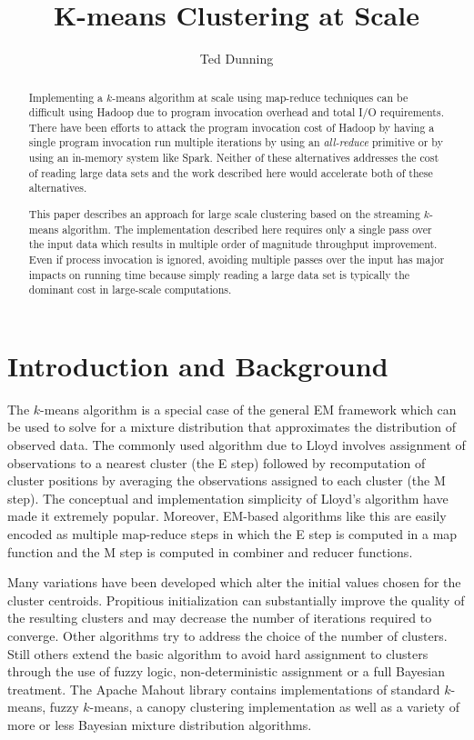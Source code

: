 \documentclass[11pt]{amsart}
\title{K-means Clustering at Scale}
\author{Ted Dunning}
\begin{document}
\begin{abstract}
Implementing a $k$-means algorithm at scale using map-reduce techniques can be difficult using Hadoop due to program invocation overhead and total I/O requirements.  There have been efforts to attack the program invocation cost of Hadoop by having a single program invocation run multiple iterations by using an {\em all-reduce} primitive or by using an in-memory system like Spark.  Neither of these alternatives addresses the cost of reading large data sets and the work described here would accelerate both of these alternatives.

This paper describes an approach for large scale clustering based on the streaming $k$-means algorithm.  The implementation described here requires only a single pass over the input data which results in multiple order of magnitude throughput improvement.  Even if process invocation is ignored, avoiding multiple passes over the input has major impacts on running time because simply reading a large data set is typically the dominant cost in large-scale computations.
\end{abstract}
\maketitle
\section{Introduction and Background}

The $k$-means algorithm is a special case of the general EM framework which can be used to solve for a mixture distribution that approximates the distribution of observed data.  The commonly used algorithm due to Lloyd\cite{k-means} involves assignment of observations to a nearest cluster (the E step) followed by recomputation of cluster positions by averaging the observations assigned to each cluster (the M step).
The conceptual and implementation simplicity of Lloyd's algorithm have made it extremely popular.  Moreover, EM-based algorithms like this are easily encoded as multiple map-reduce steps in which the E step is computed in a map function and the M step is computed in combiner and reducer functions.

Many variations have been developed which alter the initial values chosen for the cluster centroids.  Propitious initialization can substantially improve the quality of the resulting clusters and may decrease the number of iterations required to converge.  Other algorithms try to address the choice of the number of clusters.  Still others extend the basic algorithm to avoid hard assignment to clusters through the use of fuzzy logic, non-deterministic assignment or a full Bayesian treatment.  The Apache Mahout library\cite{mahout}
 contains implementations of standard $k$-means, fuzzy $k$-means, a canopy clustering implementation as well as a variety of more or less Bayesian mixture distribution algorithms.  
\end{document}
